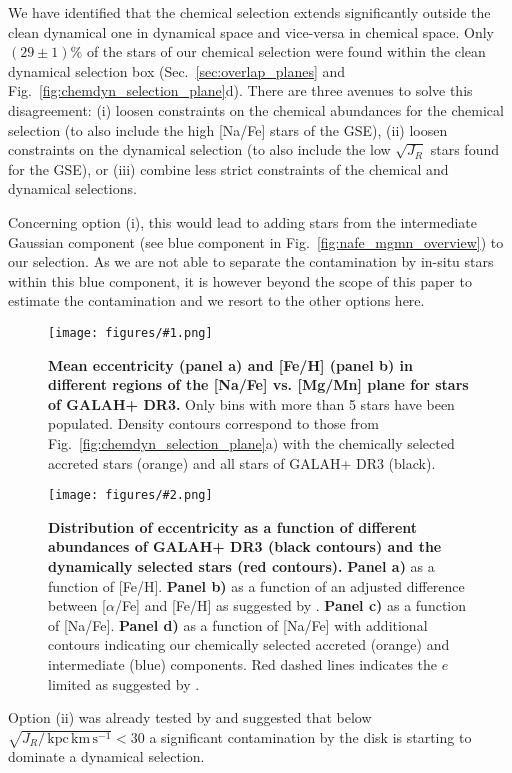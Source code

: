 \documentclass[fleqn,usenatbib]{mnras}
\newcommand{\kpckms}{\,\mathrm{kpc\,km\,s^{-1}}}	%
\newcommand{\codeicon}{{\faCloudDownload}}
\newcommand{\codelink}[1]{\href{https://github.com/svenbuder/Accreted-stars-in-GALAH-DR3/tree/main/figures/#1.ipynb}{\codeicon}\,\,}
\newcommand{\oscaption}[2]{\caption{#2 \codelink{#1}}}
\newcommand{\figuretextwidth}[4]{\begin{figure*} \centering \texttt{[image: figures/\#2.png]}\oscaption{#3}{#4}\label{fig:#2} \end{figure*}}
\newcommand{\figurecolumnwidth}[3]{\begin{figure} \centering \texttt{[image: figures/\#1.png]}\oscaption{#2}{#3}\label{fig:#1} \end{figure}}
\begin{document}
We have identified that the chemical selection extends significantly outside the clean dynamical one in dynamical space and vice-versa in chemical space. Only $(29\pm1)\%$ of the stars of our chemical selection were found within the clean dynamical selection box (Sec.~\ref{sec:overlap_planes} and Fig.~\ref{fig:chemdyn_selection_plane}d). There are three avenues to solve this disagreement:
(i) loosen constraints on the chemical abundances for the chemical selection (to also include the high [Na/Fe] stars of the GSE), 
(ii) loosen constraints on the dynamical selection (to also include the low $\sqrt{J_R}$ stars found for the GSE), or 
(iii) combine less strict constraints of the chemical and dynamical selections.

Concerning option (i), this would lead to adding stars from the intermediate Gaussian component (see blue component in Fig.~\ref{fig:nafe_mgmn_overview}) to our selection. As we are not able to separate the contamination by in-situ stars within this blue component, it is however beyond the scope of this paper to estimate the contamination and we resort to the other options here.

\figurecolumnwidth{NaFe_MgMn_Fe_H_ecc}{chronochemodynamic_comparison}{
\textbf{Mean eccentricity (panel a) and [Fe/H] (panel b) in different regions of the [Na/Fe] vs. [Mg/Mn] plane for stars of GALAH+ DR3.}
Only bins with more than 5 stars have been populated.
Density contours correspond to those from Fig.~\ref{fig:chemdyn_selection_plane}a) with the chemically selected accreted stars (orange) and all stars of GALAH+ DR3 (black).
}

\figuretextwidth{17cm}{nafe_e}{chronochemodynamic_comparison}{
\textbf{Distribution of eccentricity as a function of different abundances of GALAH+ DR3 (black contours) and the dynamically selected stars (red contours).}
\textbf{Panel a)} as a function of [Fe/H].
\textbf{Panel b)} as a function of an adjusted difference between [$\alpha$/Fe] and [Fe/H] as suggested by \citet{Naidu2020}.
\textbf{Panel c)} as a function of [Na/Fe].
\textbf{Panel d)} as a function of [Na/Fe] with additional contours indicating our chemically selected accreted (orange) and intermediate (blue) components.
Red dashed lines indicates the $e$ limited as suggested by \citet{Naidu2020}.
}

Option (ii) was already tested by \citet{Feuillet2020} and suggested that below $\sqrt{J_R / \kpckms} < 30$ a significant contamination by the disk is starting to dominate a dynamical selection.
\end{document}
